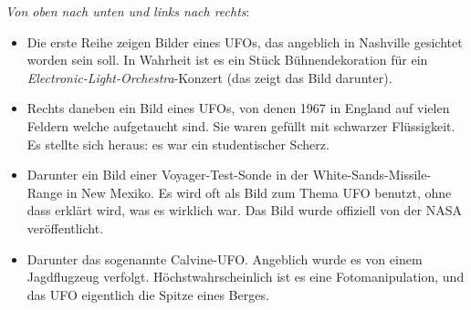 \documentclass{scrartcl}
\begin{document}
\textit{Von oben nach unten und links nach rechts}:

\begin{itemize}
	\item Die erste Reihe zeigen Bilder eines UFOs, das angeblich in Nashville gesichtet worden sein soll. In Wahrheit ist es ein Stück Bühnendekoration für ein \textit{Electronic-Light-Orchestra}-Konzert (das zeigt das Bild darunter).
	\item Rechts daneben ein Bild eines UFOs, von denen 1967 in England auf vielen Feldern welche aufgetaucht sind. Sie waren gefüllt mit schwarzer Flüssigkeit. Es stellte sich heraus: es war ein studentischer Scherz.

	\item Darunter ein Bild einer Voyager-Test-Sonde in der White-Sands-Missile-Range in New Mexiko. Es wird oft als Bild zum Thema UFO benutzt, ohne dass erklärt wird, was es wirklich war. Das Bild wurde offiziell von der NASA veröffentlicht.


	\item Darunter das sogenannte Calvine-UFO. Angeblich wurde es von einem Jagdflugzeug verfolgt. Höchstwahrscheinlich ist es eine Fotomanipulation, und das UFO eigentlich die Spitze eines Berges.

\end{itemize}
\end{document}
